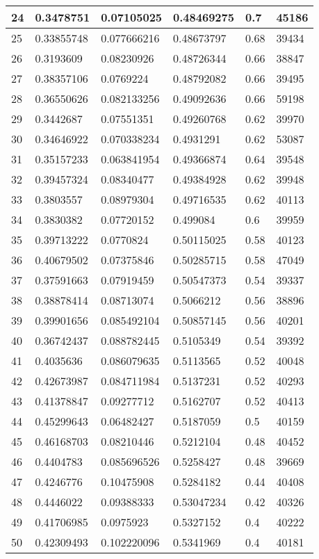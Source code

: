 \begin{longtable}{|l|l|l|l|l|l|}
24 & 0.3478751 & 0.07105025 & 0.48469275 & 0.7 & 45186 \\ \hline 
25 & 0.33855748 & 0.077666216 & 0.48673797 & 0.68 & 39434 \\ \hline 
26 & 0.3193609 & 0.08230926 & 0.48726344 & 0.66 & 38847 \\ \hline 
27 & 0.38357106 & 0.0769224 & 0.48792082 & 0.66 & 39495 \\ \hline 
28 & 0.36550626 & 0.082133256 & 0.49092636 & 0.66 & 59198 \\ \hline 
29 & 0.3442687 & 0.07551351 & 0.49260768 & 0.62 & 39970 \\ \hline 
30 & 0.34646922 & 0.070338234 & 0.4931291 & 0.62 & 53087 \\ \hline 
31 & 0.35157233 & 0.063841954 & 0.49366874 & 0.64 & 39548 \\ \hline 
32 & 0.39457324 & 0.08340477 & 0.49384928 & 0.62 & 39948 \\ \hline 
33 & 0.3803557 & 0.08979304 & 0.49716535 & 0.62 & 40113 \\ \hline 
34 & 0.3830382 & 0.07720152 & 0.499084 & 0.6 & 39959 \\ \hline 
35 & 0.39713222 & 0.0770824 & 0.50115025 & 0.58 & 40123 \\ \hline 
36 & 0.40679502 & 0.07375846 & 0.50285715 & 0.58 & 47049 \\ \hline 
37 & 0.37591663 & 0.07919459 & 0.50547373 & 0.54 & 39337 \\ \hline 
38 & 0.38878414 & 0.08713074 & 0.5066212 & 0.56 & 38896 \\ \hline 
39 & 0.39901656 & 0.085492104 & 0.50857145 & 0.56 & 40201 \\ \hline 
40 & 0.36742437 & 0.088782445 & 0.5105349 & 0.54 & 39392 \\ \hline 
41 & 0.4035636 & 0.086079635 & 0.5113565 & 0.52 & 40048 \\ \hline 
42 & 0.42673987 & 0.084711984 & 0.5137231 & 0.52 & 40293 \\ \hline 
43 & 0.41378847 & 0.09277712 & 0.5162707 & 0.52 & 40413 \\ \hline 
44 & 0.45299643 & 0.06482427 & 0.5187059 & 0.5 & 40159 \\ \hline 
45 & 0.46168703 & 0.08210446 & 0.5212104 & 0.48 & 40452 \\ \hline 
46 & 0.4404783 & 0.085696526 & 0.5258427 & 0.48 & 39669 \\ \hline 
47 & 0.4246776 & 0.10475908 & 0.5284182 & 0.44 & 40408 \\ \hline 
48 & 0.4446022 & 0.09388333 & 0.53047234 & 0.42 & 40326 \\ \hline 
49 & 0.41706985 & 0.0975923 & 0.5327152 & 0.4 & 40222 \\ \hline 
50 & 0.42309493 & 0.102220096 & 0.5341969 & 0.4 & 40181 \\ \hline 
\end{longtable}